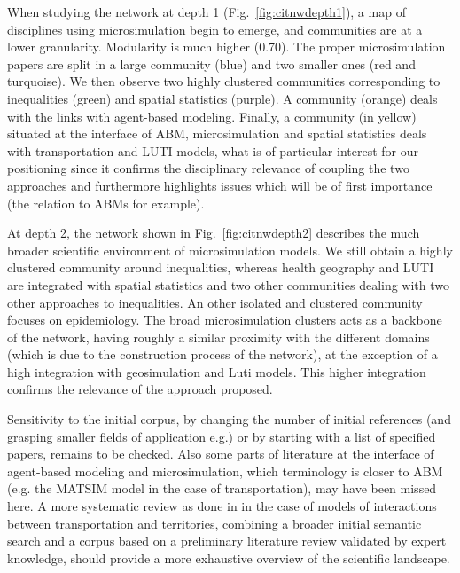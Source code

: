When studying the network at depth 1 (Fig.~\ref{fig:citnwdepth1}), a map of disciplines using microsimulation begin to emerge, and communities are at a lower granularity. Modularity is much higher (0.70). The proper microsimulation papers are split in a large community (blue) and two smaller ones (red and turquoise). We then observe two highly clustered communities corresponding to inequalities (green) and spatial statistics (purple). A community (orange) deals with the links with agent-based modeling. Finally, a community (in yellow) situated at the interface of ABM, microsimulation and spatial statistics deals with transportation and LUTI models, what is of particular interest for our positioning since it confirms the disciplinary relevance of coupling the two approaches and furthermore highlights issues which will be of first importance (the relation to ABMs for example).

At depth 2, the network shown in Fig.~\ref{fig:citnwdepth2} describes the much broader scientific environment of microsimulation models. We still obtain a highly clustered community around inequalities, whereas health geography and LUTI are integrated with spatial statistics and two other communities dealing with two other approaches to inequalities. An other isolated and clustered community focuses on epidemiology. The broad microsimulation clusters acts as a backbone of the network, having roughly a similar proximity with the different domains (which is due to the construction process of the network), at the exception of a high integration with geosimulation and Luti models. This higher integration confirms the relevance of the approach proposed.

Sensitivity to the initial corpus, by changing the number of initial references (and grasping smaller fields of application e.g.) or by starting with a list of specified papers, remains to be checked. Also some parts of literature at the interface of agent-based modeling and microsimulation, which terminology is closer to ABM (e.g. the MATSIM model in the case of transportation), may have been missed here. A more systematic review as done in \cite{raimbault2018caracterisation} in the case of models of interactions between transportation and territories, combining a broader initial semantic search and a corpus based on a preliminary literature review validated by expert knowledge, should provide a more exhaustive overview of the scientific landscape.


